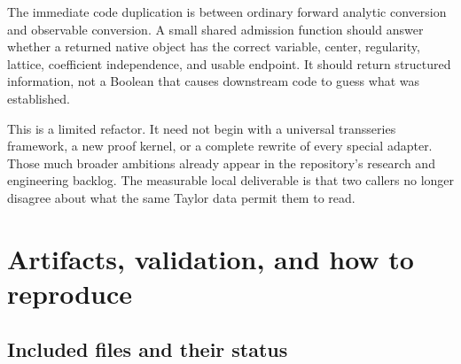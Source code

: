 \documentclass[11pt,letterpaper]{article}
\begin{document}
The immediate code duplication is between ordinary forward analytic conversion and observable conversion. A small shared admission function should answer whether a returned native object has the correct variable, center, regularity, lattice, coefficient independence, and usable endpoint. It should return structured information, not a Boolean that causes downstream code to guess what was established.

This is a limited refactor. It need not begin with a universal transseries framework, a new proof kernel, or a complete rewrite of every special adapter. Those much broader ambitions already appear in the repository's research and engineering backlog. The measurable local deliverable is that two callers no longer disagree about what the same Taylor data permit them to read.

\section{Artifacts, validation, and how to reproduce}

\subsection{Included files and their status}
\end{document}
